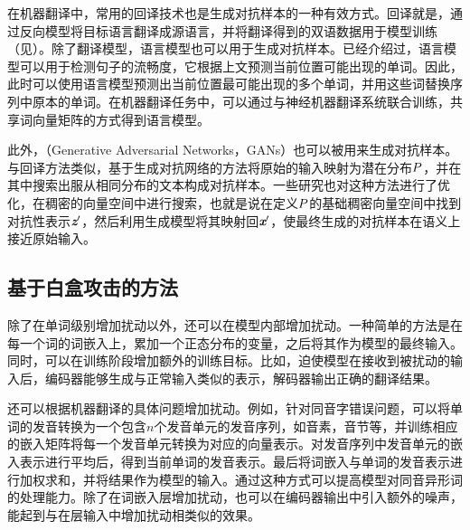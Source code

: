 \parinterval 在机器翻译中，常用的回译技术也是生成对抗样本的一种有效方式。回译就是，通过反向模型将目标语言翻译成源语言，并将翻译得到的双语数据用于模型训练（见{\chaptersixteen}）。除了翻译模型，语言模型也可以用于生成对抗样本。{\chaptertwo}已经介绍过，语言模型可以用于检测句子的流畅度，它根据上文预测当前位置可能出现的单词。因此，此时可以使用语言模型预测出当前位置最可能出现的多个单词，并用这些词替换序列中原本的单词。在机器翻译任务中，可以通过与神经机器翻译系统联合训练，共享词向量矩阵的方式得到语言模型。

\parinterval 此外，{\small{}}（Generative Adversarial Networks，GANs）也可以被用来生成对抗样本。与回译方法类似，基于生成对抗网络的方法将原始的输入映射为潜在分布${P}$，并在其中搜索出服从相同分布的文本构成对抗样本。一些研究也对这种方法进行了优化，在稠密的向量空间中进行搜索，也就是说在定义${P}$的基础稠密向量空间中找到对抗性表示$\textbf{\em z}'$，然后利用生成模型将其映射回$\textbf{\em x}'$，使最终生成的对抗样本在语义上接近原始输入。


\subsection{基于白盒攻击的方法}

\parinterval 除了在单词级别增加扰动以外，还可以在模型内部增加扰动。一种简单的方法是在每一个词的词嵌入上，累加一个正态分布的变量，之后将其作为模型的最终输入。同时，可以在训练阶段增加额外的训练目标。比如，迫使模型在接收到被扰动的输入后，编码器能够生成与正常输入类似的表示，解码器输出正确的翻译结果。

\parinterval 还可以根据机器翻译的具体问题增加扰动。例如，针对同音字错误问题，可以将单词的发音转换为一个包含$n$个发音单元的发音序列，如音素，音节等，并训练相应的嵌入矩阵将每一个发音单元转换为对应的向量表示。对发音序列中发音单元的嵌入表示进行平均后，得到当前单词的发音表示。最后将词嵌入与单词的发音表示进行加权求和，并将结果作为模型的输入。通过这种方式可以提高模型对同音异形词的处理能力。除了在词嵌入层增加扰动，也可以在编码器输出中引入额外的噪声，能起到与在层输入中增加扰动相类似的效果。

